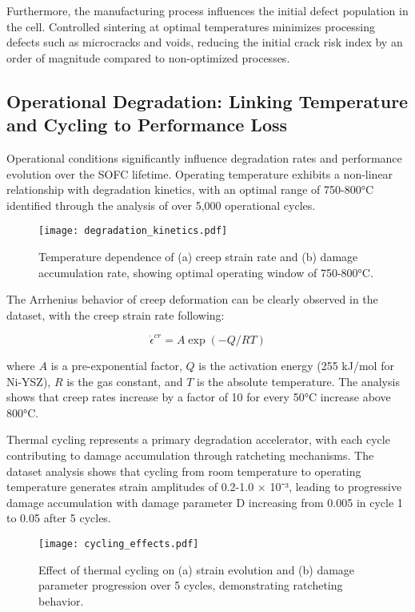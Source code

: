 \documentclass[10pt,conference]{IEEEtran}
\begin{document}
Furthermore, the manufacturing process influences the initial defect population in the cell. Controlled sintering at optimal temperatures minimizes processing defects such as microcracks and voids, reducing the initial crack risk index by an order of magnitude compared to non-optimized processes.

\subsection{Operational Degradation: Linking Temperature and Cycling to Performance Loss}

Operational conditions significantly influence degradation rates and performance evolution over the SOFC lifetime. Operating temperature exhibits a non-linear relationship with degradation kinetics, with an optimal range of 750-800°C identified through the analysis of over 5,000 operational cycles.

\begin{figure}[H]
\centering
\texttt{[image: degradation\_kinetics.pdf]}
\caption{Temperature dependence of (a) creep strain rate and (b) damage accumulation rate, showing optimal operating window of 750-800°C.}
\label{fig:degradation_kinetics}
\end{figure}

The Arrhenius behavior of creep deformation can be clearly observed in the dataset, with the creep strain rate following:

\begin{equation}
\dot{\epsilon}^{cr} = A \exp(-Q/RT)
\end{equation}

where $A$ is a pre-exponential factor, $Q$ is the activation energy (255 kJ/mol for Ni-YSZ), $R$ is the gas constant, and $T$ is the absolute temperature. The analysis shows that creep rates increase by a factor of 10 for every 50°C increase above 800°C.

Thermal cycling represents a primary degradation accelerator, with each cycle contributing to damage accumulation through ratcheting mechanisms. The dataset analysis shows that cycling from room temperature to operating temperature generates strain amplitudes of 0.2-1.0 × 10⁻³, leading to progressive damage accumulation with damage parameter D increasing from 0.005 in cycle 1 to 0.05 after 5 cycles.

\begin{figure}[H]
\centering
\texttt{[image: cycling\_effects.pdf]}
\caption{Effect of thermal cycling on (a) strain evolution and (b) damage parameter progression over 5 cycles, demonstrating ratcheting behavior.}
\label{fig:cycling_effects}
\end{figure}
\end{document}
